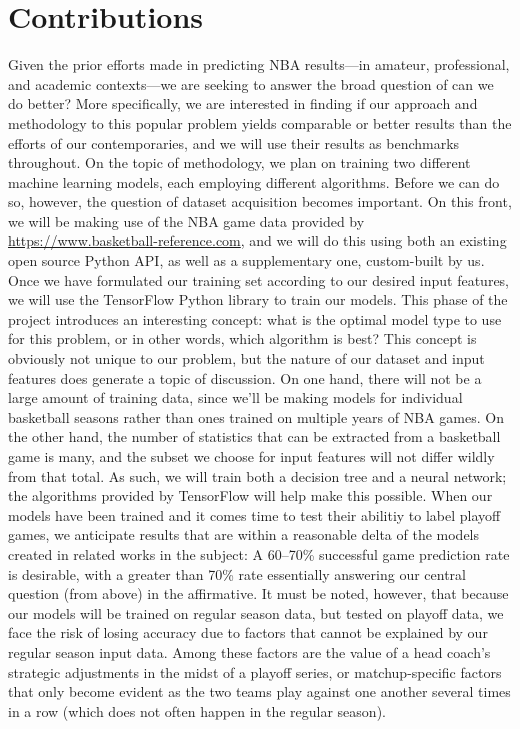 \documentclass[letterpaper]{article} %
\begin{document}
\section{Contributions}

Given the prior efforts made in predicting NBA results---in amateur, professional, and academic contexts---we are seeking to answer the broad question of can we do better? More specifically, we are interested in finding if our approach and methodology to this popular problem yields comparable or better results than the efforts of our contemporaries, and we will use their results as benchmarks throughout. On the topic of methodology, we plan on training two different machine learning models, each employing different algorithms. Before we can do so, however, the question of dataset acquisition becomes important. On this front, we will be making use of the NBA game data provided by \href{https://www.basketball-reference.com}{https://www.basketball-reference.com}, and we will do this using both an existing open source Python API, as well as a supplementary one, custom-built by us. Once we have formulated our training set according to our desired input features, we will use the TensorFlow Python library to train our models. This phase of the project introduces an interesting concept: what is the optimal model type to use for this problem, or in other words, which algorithm is best? This concept is obviously not unique to our problem, but the nature of our dataset and input features does generate a topic of discussion. On one hand, there will not be a large amount of training data, since we’ll be making models for individual basketball seasons rather than ones trained on multiple years of NBA games. On the other hand, the number of statistics that can be extracted from a basketball game is many, and the subset we choose for input features will not differ wildly from that total. As such, we will train both a decision tree and a neural network; the algorithms provided by TensorFlow will help make this possible. When our models have been trained and it comes time to test their abilitiy to label playoff games, we anticipate results that are within a reasonable delta of the models created in related works in the subject: A 60--70\% successful game prediction rate is desirable, with a greater than 70\% rate essentially answering our central question (from above) in the affirmative. It must be noted, however, that because our models will be trained on regular season data, but tested on playoff data, we face the risk of losing accuracy due to factors that cannot be explained by our regular season input data. Among these factors are the value of a head coach’s strategic adjustments in the midst of a playoff series, or matchup-specific factors that only become evident as the two teams play against one another several times in a row (which does not often happen in the regular season).
\end{document}
